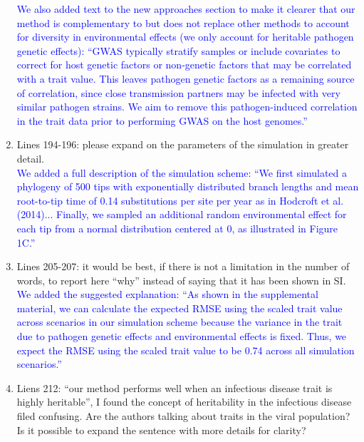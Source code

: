 \documentclass[11pt]{article}
\begin{document}
\begin{enumerate}
    \textcolor{blue}{We also added text to the new approaches section to make it clearer that our method is complementary to but does not replace other methods to account for diversity in environmental effects (we only account for heritable pathogen genetic effects): ``GWAS typically stratify samples or include covariates to correct for host genetic factors or non-genetic factors that may be correlated with a trait value. This leaves pathogen genetic factors as a remaining source of correlation, since close transmission partners may be infected with very similar pathogen strains. We aim to remove this pathogen-induced correlation in the trait data prior to performing GWAS on the host genomes.''}
    \item Lines 194-196:  please expand on the parameters of the simulation in greater detail. \\
    \textcolor{blue}{We added a full description of the simulation scheme: ``We first simulated a phylogeny of 500 tips with exponentially distributed branch lengths and mean root-to-tip time of 0.14 substitutions per site per year as in Hodcroft et al. (2014)... Finally, we sampled an additional random environmental effect for each tip from a normal distribution centered at 0, as illustrated in Figure 1C.''}  
    \item Lines 205-207: it would be best, if there is not a limitation in the number of words, to report here “why” instead of saying that it has been shown in SI. \\
    \textcolor{blue}{We added the suggested explanation: ``As shown in the supplemental material, we can calculate the expected RMSE using the scaled trait value across scenarios in our simulation scheme because the variance in the trait due to pathogen genetic effects and environmental effects is fixed. Thus, we expect the RMSE using the scaled trait value to be 0.74 across all simulation scenarios.''}
    \item Liens 212: “our method performs well when an infectious disease trait is highly heritable”, I found the concept of heritability in the infectious disease filed confusing. Are the authors talking about traits in the viral population? Is it possible to expand the sentence with more details for clarity? \\

\end{enumerate}
\end{document}
